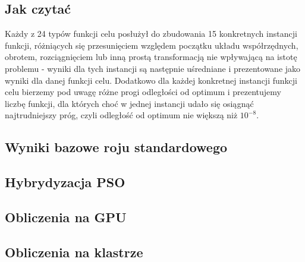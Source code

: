 \documentclass[12pt, twoside, openany, abstract=on]{report}
\theoremstyle{definition}
\begin{document}
\subsection{Jak czytać}
Każdy z 24 typów funkcji celu posłużył do zbudowania 15 konkretnych instancji funkcji, różniących się przesunięciem względem początku układu współrzędnych, obrotem, rozciągnięciem lub inną prostą transformacją nie wpływającą na istotę problemu - wyniki dla tych instancji są następnie uśredniane i prezentowane jako wyniki dla danej funkcji celu. Dodatkowo dla każdej konkretnej instancji funkcji celu bierzemy pod uwagę różne progi odległości od optimum i prezentujemy liczbę funkcji, dla których choć w jednej instancji udało się osiągnąć najtrudniejszy próg, czyli odległość od optimum nie większą niż $10^{-8}$.


\subsection{Wyniki bazowe roju standardowego}

\subsection{Hybrydyzacja PSO}

\subsection{Obliczenia na GPU}

\subsection{Obliczenia na klastrze}
\end{document}
